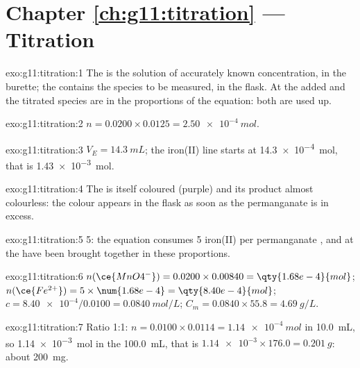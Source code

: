 \section*{Chapter \ref{ch:g11:titration} --- Titration}

\begin{solution}{exo:g11:titration:1}
The  is the solution of accurately known concentration, in the
burette; the  contains the species to be measured, in
the flask. At  the  added and the titrated species are
in the proportions of the equation: both are used up.
\end{solution}

\begin{solution}{exo:g11:titration:2}
$n = 0.0200 \times 0.0125 = \qty{2.50e-4}{mol}$.
\end{solution}

\begin{solution}{exo:g11:titration:3}
$V_E = \qty{14.3}{mL}$; the iron(II) line starts at
\qty{14.3e-4}{mol}, that is \qty{1.43e-3}{mol}.
\end{solution}

\begin{solution}{exo:g11:titration:4}
The  is itself coloured (purple) and its product almost
colourless: the colour appears in the flask as soon as the permanganate
is in excess.
\end{solution}

\begin{solution}{exo:g11:titration:5}
5: the equation consumes 5 iron(II)  per permanganate , and at
 the  have been brought together in these
proportions.
\end{solution}

\begin{solution}{exo:g11:titration:6}
$n(\ce{MnO4^-}) = 0.0200 \times 0.00840 = \qty{1.68e-4}{mol}$;
$n(\ce{Fe^{2+}}) = 5 \times \num{1.68e-4} = \qty{8.40e-4}{mol}$;
$c = \num{8.40e-4} / 0.0100 = \qty{0.0840}{mol/L}$;
$C_m = 0.0840 \times 55.8 = \qty{4.69}{g/L}$.
\end{solution}

\begin{solution}{exo:g11:titration:7}
Ratio 1:1: $n = 0.0100 \times 0.0114 = \qty{1.14e-4}{mol}$ in
\qty{10.0}{mL}, so \qty{1.14e-3}{mol} in the \qty{100.0}{mL}, that is
$\num{1.14e-3} \times 176.0 = \qty{0.201}{g}$: about \qty{200}{mg}.
\end{solution}

